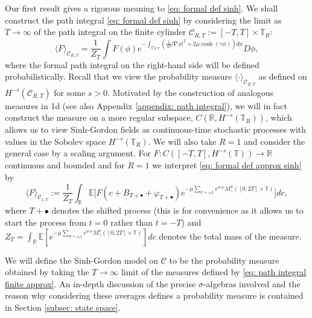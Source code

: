 \documentclass[11pt]{amsart}
\numberwithin{equation}{section}
\theoremstyle{definition}
\newcommand{\R}{\mathbb{R}}
\newcommand{\mc}{\mathcal}
\def\T{\mathbb{T}}
\begin{document}
Our first result gives a rigorous meaning to \eqref{eq: formal def sinh}. We shall construct the path integral \eqref{eq: formal def sinh} by considering the limit as $T\to \infty$  of the path integral on the finite cylinder $\mc{C}_{R,T}:=[-T,T]\times \T_R$:
\begin{equation} \label{eq: formal def approx sinh}
\langle F \rangle_{\mc{C}_{R,T}}
=
\frac{1}{Z_{T}} \int F(\phi) e^{- \int_{\mc{C}_{R,T}}  ( \frac {1} {4 \pi} |\nabla \phi|^2 +2\mu \cosh(\gamma \phi) ) dx} D\phi,
\end{equation}
where the formal path integral on the right-hand side will be defined probabilistically. Recall that we view the probability measure $\langle \cdot \rangle_{\mathcal C_{R,T}}$ as defined on $H^{-s}(\mathcal C_{R,T})$ for some $s>0$. Motivated by the construction of analogous measures in 1d \cite{OS99, LHB} (see also Appendix \ref{appendix: path integral}), we will in fact construct the measure on a more regular subspace, $C(\mathbb R, H^{-s}(\mathbb T_R))$, which allows us to view Sinh-Gordon fields as continuous-time stochastic processes with values in the Sobolev space $H^{-s}(\mathbb T_R)$. We will also take $R=1$ and consider the general case by a scaling argument. For $F:C([-T,T],H^{-s}(\T))\to \R$ continuous and bounded and for $R=1$ we interpret \eqref{eq: formal def approx sinh} by 
\begin{equation} \label{eq: path integral finite approx}
\langle F \rangle_{\mc{C}_{1,T}}
:=
\frac{1}{Z_T} \int_{\R}\mathbb{E} \Big[ F(c+B_{T+\bullet} + \varphi_{T+\bullet}) e^{- \mu \sum_{\sigma = \pm 1} e^{\sigma\gamma c}M_\gamma^\sigma([0,2T]\times \T)}  \Big]dc,
\end{equation}
where $T+\bullet$ denotes the shifted process (this is for convenience as it allows us to start the process from $t=0$ rather than $t=-T$) and $Z_T= \int_\mathbb R \mathbb E[e^{- \mu \sum_{\sigma = \pm 1} e^{\sigma\gamma c}M_\gamma^\sigma([0,2T]\times \mathbb T)} ]dc$ denotes the total mass of the measure. 

We will define the Sinh-Gordon model on $\mathcal{C}$ to be the probability measure obtained by taking the $T\rightarrow \infty$ limit of the measures defined by \eqref{eq: path integral finite approx}. An in-depth discussion of the precise $\sigma$-algebras involved and the reason why considering these averages defines a probability measure is contained in Section \ref{subsec: state space}.
\end{document}
